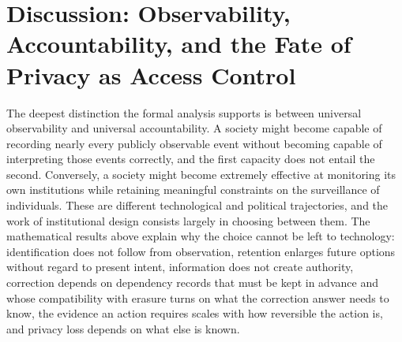 \documentclass[11pt]{article}
\theoremstyle{plain}
\theoremstyle{definition}
\theoremstyle{remark}
\begin{document}
\section{Discussion: Observability, Accountability, and the Fate of Privacy as Access Control}

The deepest distinction the formal analysis supports is between universal observability and universal accountability. A society might become capable of recording nearly every publicly observable event without becoming capable of interpreting those events correctly, and the first capacity does not entail the second. Conversely, a society might become extremely effective at monitoring its own institutions while retaining meaningful constraints on the surveillance of individuals. These are different technological and political trajectories, and the work of institutional design consists largely in choosing between them. The mathematical results above explain why the choice cannot be left to technology: identification does not follow from observation, retention enlarges future options without regard to present intent, information does not create authority, correction depends on dependency records that must be kept in advance and whose compatibility with erasure turns on what the correction answer needs to know, the evidence an action requires scales with how reversible the action is, and privacy loss depends on what else is known.
\end{document}
